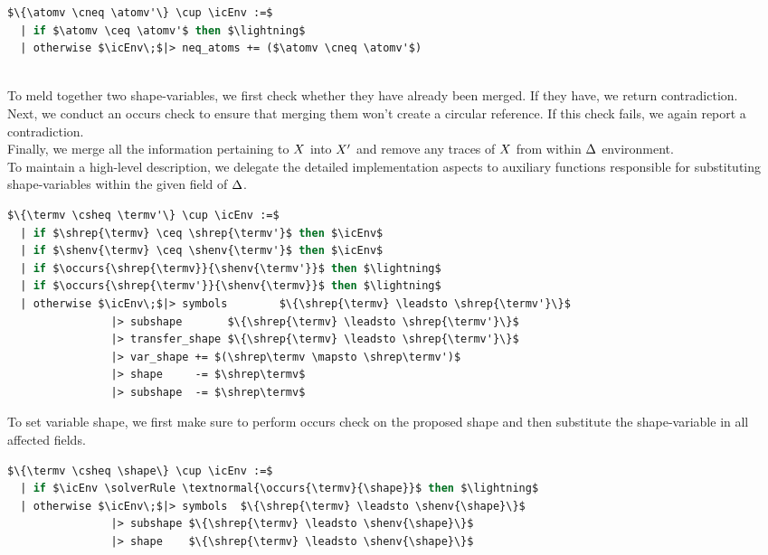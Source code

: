 \documentclass[english, mgr]{iithesis}
\begin{document}
\begin{minipage}{0.6\textwidth}
\begin{lstlisting}[mathescape, language=OCaml]
$\{\atomv \cneq \atomv'\} \cup \icEnv :=$
  | if $\atomv \ceq \atomv'$ then $\lightning$
  | otherwise $\icEnv\;$|> neq_atoms += ($\atomv \cneq \atomv'$)
\end{lstlisting}
\end{minipage}
\\
To meld together two shape-variables, we first check whether they have already been merged.
If they have, we return contradiction.
\\
Next, we conduct an occurs check to ensure that merging them won't create a circular reference. If this check fails, we again report a contradiction.
\\
Finally, we merge all the information pertaining to $X$ into $X'$ and
remove any traces of $X$ from within $\Delta$ environment.
\\
To maintain a high-level description, we delegate the detailed implementation aspects to auxiliary functions responsible for substituting shape-variables within the given field of $\Delta$.
\begin{lstlisting}[mathescape, language=OCaml]
$\{\termv \csheq \termv'\} \cup \icEnv :=$
  | if $\shrep{\termv} \ceq \shrep{\termv'}$ then $\icEnv$
  | if $\shenv{\termv} \ceq \shenv{\termv'}$ then $\icEnv$
  | if $\occurs{\shrep{\termv}}{\shenv{\termv'}}$ then $\lightning$
  | if $\occurs{\shrep{\termv'}}{\shenv{\termv}}$ then $\lightning$
  | otherwise $\icEnv\;$|> symbols        $\{\shrep{\termv} \leadsto \shrep{\termv'}\}$
                |> subshape       $\{\shrep{\termv} \leadsto \shrep{\termv'}\}$
                |> transfer_shape $\{\shrep{\termv} \leadsto \shrep{\termv'}\}$
                |> var_shape += $(\shrep\termv \mapsto \shrep\termv')$
                |> shape     -= $\shrep\termv$
                |> subshape  -= $\shrep\termv$
\end{lstlisting}
To set variable shape, we first make sure to perform occurs check on the proposed shape
and then substitute the shape-variable in all affected fields.
\begin{lstlisting}[mathescape, language=OCaml]
$\{\termv \csheq \shape\} \cup \icEnv :=$
  | if $\icEnv \solverRule \textnormal{\occurs{\termv}{\shape}}$ then $\lightning$
  | otherwise $\icEnv\;$|> symbols  $\{\shrep{\termv} \leadsto \shenv{\shape}\}$
                |> subshape $\{\shrep{\termv} \leadsto \shenv{\shape}\}$
                |> shape    $\{\shrep{\termv} \leadsto \shenv{\shape}\}$
\end{lstlisting}
\end{document}
